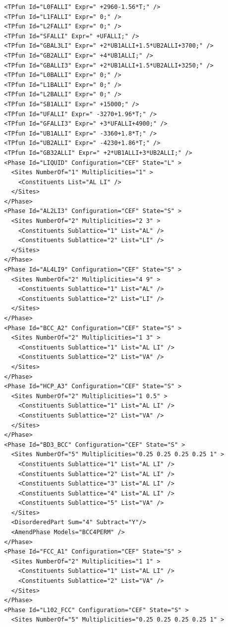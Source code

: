 \documentclass{article}
\begin{document}
\begin{appendices}
\begin{verbatim}
  <TPfun Id="L0FALLI" Expr=" +2960-1.56*T;" /> 
  <TPfun Id="L1FALLI" Expr=" 0;" /> 
  <TPfun Id="L2FALLI" Expr=" 0;" /> 
  <TPfun Id="SFALLI" Expr=" +UFALLI;" /> 
  <TPfun Id="GBAL3LI" Expr=" +2*UB1ALLI+1.5*UB2ALLI+3700;" /> 
  <TPfun Id="GB2ALLI" Expr=" +4*UB1ALLI;" /> 
  <TPfun Id="GBALLI3" Expr=" +2*UB1ALLI+1.5*UB2ALLI+3250;" /> 
  <TPfun Id="L0BALLI" Expr=" 0;" /> 
  <TPfun Id="L1BALLI" Expr=" 0;" /> 
  <TPfun Id="L2BALLI" Expr=" 0;" /> 
  <TPfun Id="SB1ALLI" Expr=" +15000;" /> 
  <TPfun Id="UFALLI" Expr=" -3270+1.96*T;" /> 
  <TPfun Id="GFALLI3" Expr=" +3*UFALLI+4900;" /> 
  <TPfun Id="UB1ALLI" Expr=" -3360+1.8*T;" /> 
  <TPfun Id="UB2ALLI" Expr=" -4230+1.86*T;" /> 
  <TPfun Id="GB32ALLI" Expr=" +2*UB1ALLI+3*UB2ALLI;" /> 
  <Phase Id="LIQUID" Configuration="CEF" State="L" >
    <Sites NumberOf="1" Multiplicities="1" >
      <Constituents List="AL LI" />
    </Sites>
  </Phase>
  <Phase Id="AL2LI3" Configuration="CEF" State="S" >
    <Sites NumberOf="2" Multiplicities="2 3" >
      <Constituents Sublattice="1" List="AL" />
      <Constituents Sublattice="2" List="LI" />
    </Sites>
  </Phase>
  <Phase Id="AL4LI9" Configuration="CEF" State="S" >
    <Sites NumberOf="2" Multiplicities="4 9" >
      <Constituents Sublattice="1" List="AL" />
      <Constituents Sublattice="2" List="LI" />
    </Sites>
  </Phase>
  <Phase Id="BCC_A2" Configuration="CEF" State="S" >
    <Sites NumberOf="2" Multiplicities="1 3" >
      <Constituents Sublattice="1" List="AL LI" />
      <Constituents Sublattice="2" List="VA" />
    </Sites>
  </Phase>
  <Phase Id="HCP_A3" Configuration="CEF" State="S" >
    <Sites NumberOf="2" Multiplicities="1 0.5" >
      <Constituents Sublattice="1" List="AL LI" />
      <Constituents Sublattice="2" List="VA" />
    </Sites>
  </Phase>
  <Phase Id="BD3_BCC" Configuration="CEF" State="S" >
    <Sites NumberOf="5" Multiplicities="0.25 0.25 0.25 0.25 1" >
      <Constituents Sublattice="1" List="AL LI" />
      <Constituents Sublattice="2" List="AL LI" />
      <Constituents Sublattice="3" List="AL LI" />
      <Constituents Sublattice="4" List="AL LI" />
      <Constituents Sublattice="5" List="VA" />
    </Sites>
    <DisorderedPart Sum="4" Subtract="Y"/>
    <AmendPhase Models="BCC4PERM" />
  </Phase>
  <Phase Id="FCC_A1" Configuration="CEF" State="S" >
    <Sites NumberOf="2" Multiplicities="1 1" >
      <Constituents Sublattice="1" List="AL LI" />
      <Constituents Sublattice="2" List="VA" />
    </Sites>
  </Phase>
  <Phase Id="L102_FCC" Configuration="CEF" State="S" >
    <Sites NumberOf="5" Multiplicities="0.25 0.25 0.25 0.25 1" >

\end{verbatim}
\end{appendices}
\end{document}
